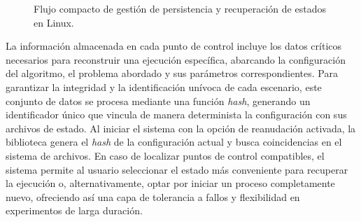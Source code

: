 \documentclass[12pt,a4paper,twoside,openright]{book}
\begin{document}
\begin{figure}[htbp]
    \caption{Flujo compacto de gestión de persistencia y recuperación de estados en Linux.}
    \label{fig:checkpoint_compacto}
\end{figure}

        La información almacenada en cada punto de control incluye los datos críticos necesarios para reconstruir una ejecución específica, abarcando la configuración del algoritmo, el problema abordado y sus parámetros correspondientes. Para garantizar la integridad y la identificación unívoca de cada escenario, este conjunto de datos se procesa mediante una función \textit{hash}, generando un identificador único que vincula de manera determinista la configuración con sus archivos de estado. Al iniciar el sistema con la opción de reanudación activada, la biblioteca genera el \textit{hash} de la configuración actual y busca coincidencias en el sistema de archivos. En caso de localizar puntos de control compatibles, el sistema permite al usuario seleccionar el estado más conveniente para recuperar la ejecución o, alternativamente, optar por iniciar un proceso completamente nuevo, ofreciendo así una capa de tolerancia a fallos y flexibilidad en experimentos de larga duración.
\end{document}
